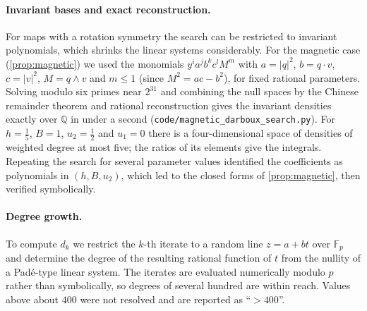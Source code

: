 \documentclass[11pt,a4paper]{article}
\theoremstyle{definition}
\theoremstyle{remark}
\begin{document}
\paragraph{Invariant bases and exact reconstruction.} For maps with a rotation symmetry the search can be
restricted to invariant polynomials, which shrinks the linear systems considerably. For the magnetic case
(\cref{prop:magnetic}) we used the monomials $y^ia^jb^kc^lM^m$ with $a=\lvert q\rvert^2$, $b=q\cdot v$,
$c=\lvert v\rvert^2$, $M=q\wedge v$ and $m\le1$ (since $M^2=ac-b^2$), for fixed rational parameters. Solving
modulo six primes near $2^{31}$ and combining the null spaces by the Chinese remainder theorem and rational
reconstruction gives the invariant densities exactly over $\mathbb Q$ in under a second
(\texttt{code/magnetic\_darboux\_search.py}). For $h=\frac15$, $B=1$, $u_2=\frac12$ and $u_1=0$ there is a
four-dimensional space of densities of weighted degree at most five; the ratios of its elements give the
integrals. Repeating the search for several parameter values identified the coefficients as polynomials in
$(h,B,u_2)$, which led to the closed forms of \cref{prop:magnetic}, then verified symbolically.

\paragraph{Degree growth.} To compute $d_k$ we restrict the $k$-th iterate to a random line $z=a+bt$ over
$\mathbb F_p$ and determine the degree of the resulting rational function of $t$ from the nullity of a
Pad\'e-type linear system. The iterates are evaluated numerically modulo $p$ rather than symbolically, so
degrees of several hundred are within reach. Values above about $400$ were not resolved and are reported as
``$>400$''.
\end{document}
